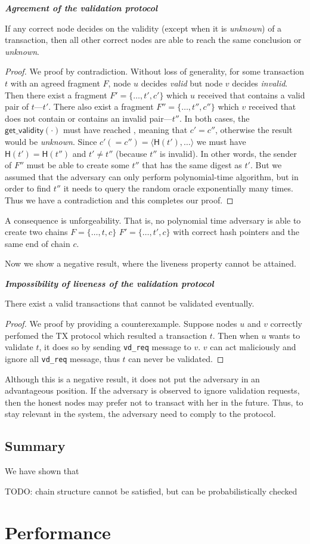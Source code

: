 \begin{lemma}
\label{lemma:validation-agreement}
\textbf{\emph{Agreement of the validation protocol}}

If any correct node decides on the validity (except when it is \emph{unknown}) of a transaction,
then all other correct nodes are able to reach the same conclusion or \emph{unknown}.
\end{lemma}
\begin{proof}
We proof by contradiction.
Without loss of generality, for some transaction $t$ with an agreed fragment $F$,
node $u$ decides \emph{valid} but node $v$ decides \emph{invalid}.
Then there exist a fragment $F' = \{ \dots, t', c'\}$ which $u$ received that contains a valid pair of $t$---$t'$.
There also exist a fragment $F'' = \{ \dots, t'', c''\}$ which $v$ received that does not contain or contains an invalid pair---$t''$.
In both cases, the $\textsf{get\_validity}(\cdot)$ must have reached ,
meaning that $c' = c''$, otherwise the result would be \emph{unknown}.
Since $c' (= c'') = \langle \textsf{H}(t'), \dots \rangle$ we must have $\textsf{H}(t') = \textsf{H}(t'')$ and $t' \ne t''$ (because $t''$ is invalid).
In other words, the sender of $F''$ must be able to create some $t''$ that has the same digest as $t'$.
But we assumed that the adversary can only perform polynomial-time algorithm, but in order to find $t''$ it needs to query the random oracle exponentially many times.
Thus we have a contradiction and this completes our proof.
\end{proof}

A consequence  is unforgeability.
That is, no polynomial time adversary is able to create two chains $F = \{ \dots, t, c\}$ $F' = \{ \dots, t', c\}$ with correct hash pointers and the same end of chain $c$.

Now we show a negative result, where the liveness property cannot be attained.
\begin{lemma}
\textbf{\emph{Impossibility of liveness of the validation protocol}}

There exist a valid transactions that cannot be validated eventually.
\end{lemma}
\begin{proof}
We proof by providing a counterexample.
Suppose nodes $u$ and $v$ correctly perfomed the TX protocol which resulted a transaction $t$.
Then when $u$ wants to validate $t$, it does so by sending \texttt{vd\_req} message to $v$.
$v$ can act maliciously and ignore all \texttt{vd\_req} message, thus $t$ can never be validated.
\end{proof}
Although this is a negative result, it does not put the adversary in an advantageous position.
If the adversary is observed to ignore validation requests, then the honest nodes may prefer not to transact with her in the future.
Thus, to stay relevant in the system, the adversary need to comply to the protocol.

\subsection{Summary}
We have shown that 

TODO: chain structure cannot be satisfied, but can be probabilistically checked

\section{Performance}
